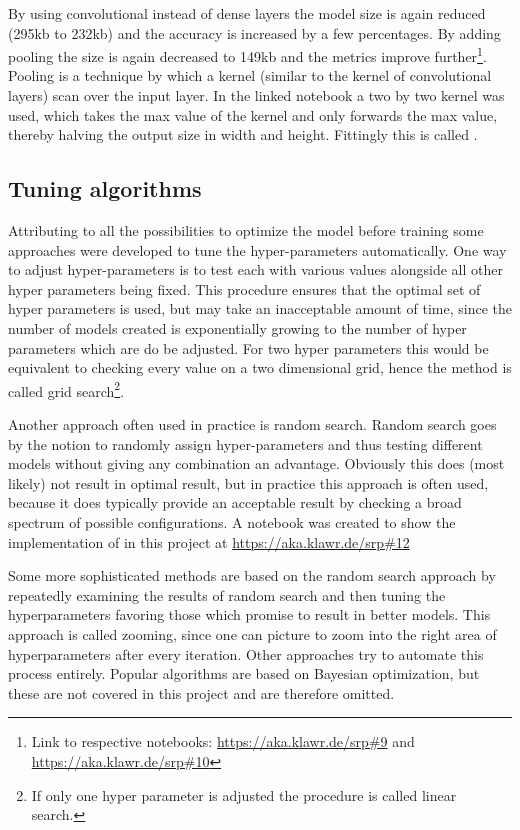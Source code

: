 By using convolutional instead of dense layers the model size is again reduced (295kb to 232kb) and the accuracy is increased by a few percentages. By adding pooling the size is again decreased to 149kb and the metrics improve further\footnote{Link to respective notebooks: \url{https://aka.klawr.de/srp\#9} and \url{https://aka.klawr.de/srp\#10}}.
Pooling is a technique by which a kernel (similar to the kernel of convolutional layers) scan over the input layer.
In the linked notebook a two by two kernel was used, which takes the max value of the kernel and only forwards the max value, thereby halving the output size in width and height.
Fittingly this is called .

\subsection{Tuning algorithms}

Attributing to all the possibilities to optimize the model before training some approaches were developed to tune the hyper-parameters automatically.
One way to adjust hyper-parameters is to test each with various values alongside all other hyper parameters being fixed.
This procedure ensures that the optimal set of hyper parameters is used, but may take an inacceptable amount of time, since the number of models created is exponentially growing to the number of hyper parameters which are do be adjusted.
For two hyper parameters this would be equivalent to checking every value on a two dimensional grid, hence the method is called grid search\footnote{If only one hyper parameter is adjusted the procedure is called linear search.}.

Another approach often used in practice is random search.
Random search goes by the notion to randomly assign hyper-parameters and thus testing different models without giving any combination an advantage.
Obviously this does (most likely) not result in optimal result, but in practice this approach is often used, because it does typically provide an acceptable result by checking a broad spectrum of possible configurations.
A notebook was created to show the implementation of  in this project at \url{https://aka.klawr.de/srp\#12}

Some more sophisticated methods are based on the random search approach by repeatedly examining the results of random search and then tuning the hyperparameters favoring those which promise to result in better models.
This approach is called zooming, since one can picture to zoom into the right area of hyperparameters after every iteration.
Other approaches try to automate this process entirely.
Popular algorithms are based on Bayesian optimization, but these are not covered in this project and are therefore omitted.

